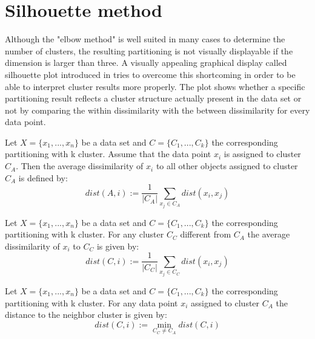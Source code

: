 \section{Silhouette method}\label{sec:silhouette}

Although the "elbow method" is well suited in many cases to determine the number of clusters, the resulting partitioning is not visually displayable if the dimension is larger than three. A visually appealing graphical display called silhouette plot introduced in \cite{rousseeuw1987silhouettes} tries to overcome this shortcoming in order to be able to interpret cluster results more properly. The plot shows whether a specific partitioning result reflects a cluster structure actually present in the data set or not by comparing the within dissimilarity with the between dissimilarity for every data point.

\begin{definition}
	Let $X=\{x_1, ..., x_n\}$ be a data set and $C=\{C_1, ..., C_k\}$ the corresponding partitioning with k cluster. Assume that the data point $x_i$ is assigned to cluster $C_A$. Then the average dissimilarity of $x_i$ to all other objects assigned to cluster $C_A$ is defined by: 
	\begin{equation*}\label{equ:dist_A}
	dist(A,i) := \frac{1}{|C_A|}\sum_{x_j \in C_A} dist(x_i, x_j)
	\end{equation*}
\end{definition}

\begin{definition}
	Let $X=\{x_1, ..., x_n\}$ be a data set and $C=\{C_1, ..., C_k\}$ the corresponding partitioning with k cluster. For any cluster $C_C$ different from $C_A$ the average dissimilarity of  $x_i$ to $C_C$ is given by: 
	\begin{equation*}\label{equ:dist_C}
		dist(C,i) := \frac{1}{|C_C|}\sum_{x_j \in C_C} dist(x_i, x_j)
	\end{equation*}
\end{definition}

\begin{definition}
	Let $X=\{x_1, ..., x_n\}$ be a data set and $C=\{C_1, ..., C_k\}$ the corresponding partitioning with k cluster. For any data point $x_i$ assigned to cluster $C_A$ the distance to the neighbor cluster is given by: 
	\begin{equation*}\label{equ:dist_B}
		dist(C,i) := \min_{C_C\neq C_A} dist(C,i)
	\end{equation*}
\end{definition}


